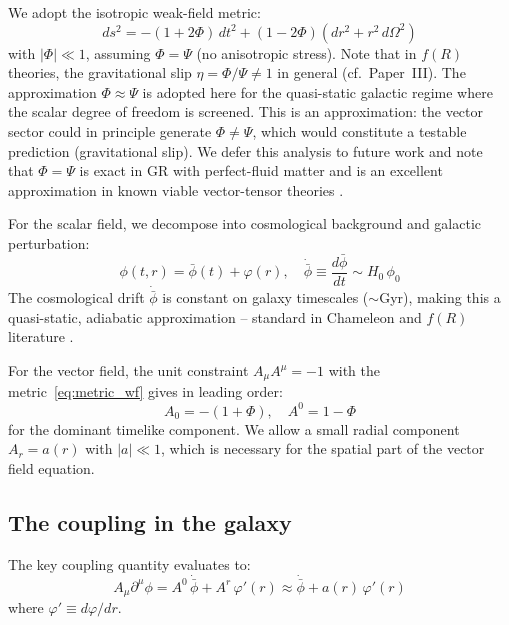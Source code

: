 \documentclass[aps,prd,twocolumn,superscriptaddress,nofootinbib]{revtex4-2}
\begin{document}
We adopt the isotropic weak-field metric:
\begin{equation}
ds^2 = -(1 + 2\Phi)\,dt^2 + (1 - 2\Phi)(dr^2 + r^2\,d\Omega^2)
\label{eq:metric_wf}
\end{equation}
with $|\Phi| \ll 1$, assuming $\Phi = \Psi$ (no anisotropic stress). Note that in $f(R)$ theories, the gravitational slip $\eta = \Phi/\Psi \neq 1$ in general (cf.\ Paper~III). The approximation $\Phi \approx \Psi$ is adopted here for the quasi-static galactic regime where the scalar degree of freedom is screened. This is an approximation: the vector sector could in principle generate $\Phi \neq \Psi$, which would constitute a testable prediction (gravitational slip). We defer this analysis to future work and note that $\Phi = \Psi$ is exact in GR with perfect-fluid matter and is an excellent approximation in known viable vector-tensor theories \cite{Skordis2021}.

For the scalar field, we decompose into cosmological background and galactic perturbation:
\begin{equation}
\phi(t,r) = \bar{\phi}(t) + \varphi(r), \quad \dot{\bar{\phi}} \equiv \frac{d\bar{\phi}}{dt} \sim H_0\,\phi_0
\label{eq:phi_split}
\end{equation}
The cosmological drift $\dot{\bar{\phi}}$ is constant on galaxy timescales ($\sim$Gyr), making this a quasi-static, adiabatic approximation -- standard in Chameleon and $f(R)$ literature \cite{HuSawicki2007}.

For the vector field, the unit constraint $A_\mu A^\mu = -1$ with the metric~\eqref{eq:metric_wf} gives in leading order:
\begin{equation}
A_0 = -(1 + \Phi), \quad A^0 = 1 - \Phi
\label{eq:A0}
\end{equation}
for the dominant timelike component. We allow a small radial component $A_r = a(r)$ with $|a| \ll 1$, which is necessary for the spatial part of the vector field equation.

\subsection{The coupling in the galaxy}
\label{sec:coupling_galaxy}

The key coupling quantity evaluates to:
\begin{equation}
A_\mu\partial^\mu\phi = A^0\,\dot{\bar{\phi}} + A^r\,\varphi'(r) \approx \dot{\bar{\phi}} + a(r)\,\varphi'(r)
\label{eq:Adphi_galaxy}
\end{equation}
where $\varphi' \equiv d\varphi/dr$.
\end{document}
